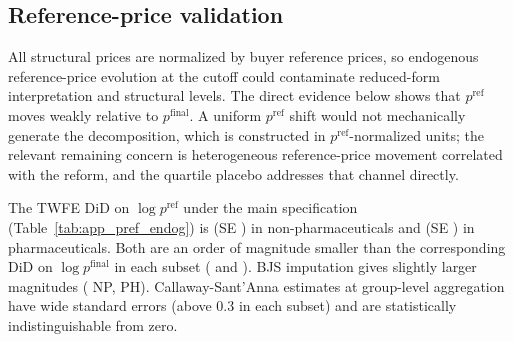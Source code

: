 \documentclass[12pt]{article}
\begin{document}
\subsection{Reference-price validation}\label{oa:pref_validation}

\begin{sloppypar}
All structural prices are normalized by buyer reference prices, so
endogenous reference-price evolution at the cutoff could contaminate
reduced-form interpretation and structural levels. The direct evidence
below shows that $p^{\mathrm{ref}}$ moves weakly relative to
$p^{\mathrm{final}}$. A uniform $p^{\mathrm{ref}}$ shift would not
mechanically generate the decomposition, which is constructed in
$p^{\mathrm{ref}}$-normalized units; the relevant remaining concern is
heterogeneous reference-price movement correlated with the reform, and the
quartile placebo addresses that channel directly.
\end{sloppypar}

The TWFE DiD on $\log p^{\mathrm{ref}}$ under the main specification
(Table~\ref{tab:app_pref_endog}) is \pRefDidEstNp{} (SE \pRefDidSeNp{}) in
non-pharmaceuticals and \pRefDidEstPh{} (SE \pRefDidSePh{}) in
pharmaceuticals. Both are an order of magnitude smaller than the
corresponding DiD on $\log p^{\mathrm{final}}$ in each subset
(\pRefSanityFinalEstNp{} and \pRefSanityFinalEstPh{}). BJS imputation gives slightly larger magnitudes
(\pRefDidBjsEstNp{} NP, \pRefDidBjsEstPh{} PH). Callaway-Sant'Anna estimates
at group-level aggregation have wide standard errors (above 0.3 in each
subset) and are statistically indistinguishable from zero.
\end{document}
